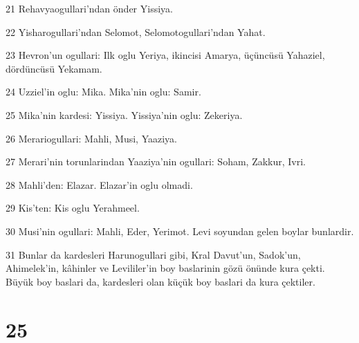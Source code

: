 \par 21 Rehavyaogullari'ndan önder Yissiya.
\par 22 Yisharogullari'ndan Selomot, Selomotogullari'ndan Yahat.
\par 23 Hevron'un ogullari: Ilk oglu Yeriya, ikincisi Amarya, üçüncüsü Yahaziel, dördüncüsü Yekamam.
\par 24 Uzziel'in oglu: Mika. Mika'nin oglu: Samir.
\par 25 Mika'nin kardesi: Yissiya. Yissiya'nin oglu: Zekeriya.
\par 26 Merariogullari: Mahli, Musi, Yaaziya.
\par 27 Merari'nin torunlarindan Yaaziya'nin ogullari: Soham, Zakkur, Ivri.
\par 28 Mahli'den: Elazar. Elazar'in oglu olmadi.
\par 29 Kis'ten: Kis oglu Yerahmeel.
\par 30 Musi'nin ogullari: Mahli, Eder, Yerimot. Levi soyundan gelen boylar bunlardir.
\par 31 Bunlar da kardesleri Harunogullari gibi, Kral Davut'un, Sadok'un, Ahimelek'in, kâhinler ve Levililer'in boy baslarinin gözü önünde kura çekti. Büyük boy baslari da, kardesleri olan küçük boy baslari da kura çektiler.

\chapter{25}

